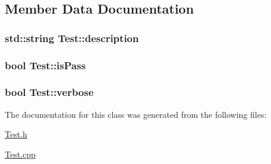 \subsection{Member Data Documentation}
\hypertarget{classTest_a9452136cd882a23b8e52f5b2a82a5bb3}{
\subsubsection[{description}]{\setlength{\rightskip}{0pt plus 5cm}std\+::string Test\+::description\hspace{0.3cm}{\ttfamily [private]}}}\label{classTest_a9452136cd882a23b8e52f5b2a82a5bb3}
\hypertarget{classTest_a91d1d78671cfc2b974b6ae3c8a88f25d}{
\subsubsection[{is\+Pass}]{\setlength{\rightskip}{0pt plus 5cm}bool Test\+::is\+Pass\hspace{0.3cm}{\ttfamily [private]}}}\label{classTest_a91d1d78671cfc2b974b6ae3c8a88f25d}
\hypertarget{classTest_ab02c0c474b2a636c948baf761df0b3c5}{
\subsubsection[{verbose}]{\setlength{\rightskip}{0pt plus 5cm}bool Test\+::verbose\hspace{0.3cm}{\ttfamily [private]}}}\label{classTest_ab02c0c474b2a636c948baf761df0b3c5}


The documentation for this class was generated from the following files\+:\begin{DoxyCompactItemize}
\item 
\hyperlink{Test_8h}{Test.\+h}\item 
\hyperlink{Test_8cpp}{Test.\+cpp}\end{DoxyCompactItemize}
